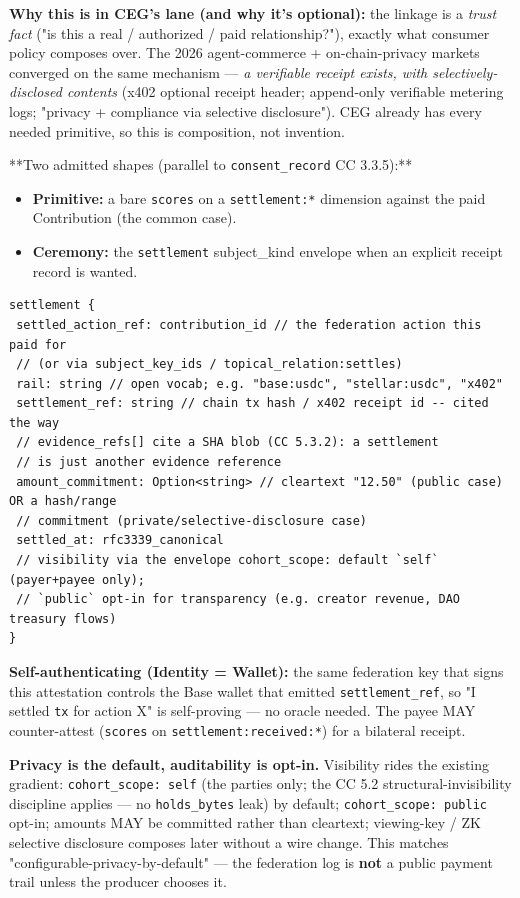 \documentclass[11pt]{article}
\begin{document}
\textbf{Why this is in CEG's lane (and why it's optional):} the linkage is a \textit{trust fact} ("is this a real / authorized / paid relationship?"), exactly what consumer policy composes over. The 2026 agent-commerce + on-chain-privacy markets converged on the same mechanism — \textit{a verifiable receipt exists, with selectively-disclosed contents} (x402 optional receipt header; append-only verifiable metering logs; "privacy + compliance via selective disclosure"). CEG already has every needed primitive, so this is composition, not invention.


**Two admitted shapes (parallel to \texttt{consent\_record} CC 3.3.5):**

\begin{itemize}\setlength\itemsep{0pt}
\item \textbf{Primitive:} a bare \texttt{scores} on a \texttt{settlement:*} dimension against the paid Contribution (the common case).
\item \textbf{Ceremony:} the \texttt{settlement} subject\_kind envelope when an explicit receipt record is wanted.
\end{itemize}


\begin{lstlisting}
settlement {
 settled_action_ref: contribution_id // the federation action this paid for
 // (or via subject_key_ids / topical_relation:settles)
 rail: string // open vocab; e.g. "base:usdc", "stellar:usdc", "x402"
 settlement_ref: string // chain tx hash / x402 receipt id -- cited the way
 // evidence_refs[] cite a SHA blob (CC 5.3.2): a settlement
 // is just another evidence reference
 amount_commitment: Option<string> // cleartext "12.50" (public case) OR a hash/range
 // commitment (private/selective-disclosure case)
 settled_at: rfc3339_canonical
 // visibility via the envelope cohort_scope: default `self` (payer+payee only);
 // `public` opt-in for transparency (e.g. creator revenue, DAO treasury flows)
}
\end{lstlisting}

\textbf{Self-authenticating (Identity = Wallet):} the same federation key that signs this attestation controls the Base wallet that emitted \texttt{settlement\_ref}, so "I settled \texttt{tx} for action X" is self-proving — no oracle needed. The payee MAY counter-attest (\texttt{scores} on \texttt{settlement:received:*}) for a bilateral receipt.


\textbf{Privacy is the default, auditability is opt-in.} Visibility rides the existing gradient: \texttt{cohort\_scope: self} (the parties only; the CC 5.2 structural-invisibility discipline applies — no \texttt{holds\_bytes} leak) by default; \texttt{cohort\_scope: public} opt-in; amounts MAY be committed rather than cleartext; viewing-key / ZK selective disclosure composes later without a wire change. This matches "configurable-privacy-by-default" — the federation log is \textbf{not} a public payment trail unless the producer chooses it.
\end{document}
